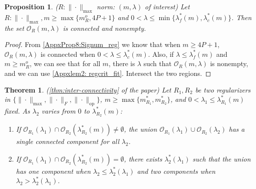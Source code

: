 \documentclass{article}
\newtheorem{theorem}{Theorem}[section]
\newtheorem{proposition}{Proposition}[section]
\newcommand{\op}{\mathrm{op}}
\begin{document}
\begin{proposition}
\label{prop9:nontrivial_l1}
($R: \|\cdot\|_{\max}$ norm: $(m, \lambda)$ of interest) Let $R: \|\cdot\|_{\max}, m \geq \max \{m_R^o, 4P+1\}$ and $0 < \lambda \leq \min\{\lambda_f^*(m), \lambda_c^{*}(m)\}$. Then the set $\mathcal{O}_R(m, \lambda)$ is connected and nonempty.
\end{proposition}
\begin{proof} 
From \cref{AppxProp8:Signum_reg} we know that when $m \geq 4P+1$, $\mathcal{O}_R(m,\lambda)$ is connected when $0 < \lambda \leq \lambda^{*}_c(m)$.
Also, if $\lambda \leq \lambda_f^*(m)$ and $m \geq m_R^o$, we can see that for all $m$, there is $\lambda$ such that $\mathcal{O}_R(m, \lambda)$ is nonempty, and we can use \cref{Appxlem2: regcrit_fit}.
Intersect the two regions.
\end{proof}

\begin{theorem}
\label{appxthm:inter-connectivity} (\cref{thm:inter-connectivity} of the paper)
Let $R_1, R_2$ be two regularizers in $\{\|\cdot\|_{\max}, \|\cdot\|_F, \|\cdot\|_{\op}\}$, $m \geq \max\{m_{R_1}^*, m_{R_2}^*\}$, and $0 < \lambda_1 \leq \lambda_{R_1}^*(m)$ fixed. As $\lambda_2$ varies from $0$ to $\lambda_{R_2}^{*}(m)$:
\begin{enumerate}
    \item[i)] If $\mathcal{O}_{R_1}(\lambda_1) \cap \mathcal{O}_{R_2}(\lambda_{R_2}^{*}(m)) \neq \emptyset$, the union $\mathcal{O}_{R_1}(\lambda_1) \cup \mathcal{O}_{R_2}(\lambda_2)$ has a single connected component for all $\lambda_2$.
    \item[ii)] If $\mathcal{O}_{R_1}(\lambda_1) \cap \mathcal{O}_{R_2}(\lambda_{R_2}^{*}(m)) = \emptyset$, there exists $\lambda_2^*(\lambda_1)$ such that the union has one component when $\lambda_2 \leq \lambda_2^*(\lambda_1)$ and two components when $\lambda_2 > \lambda_2^*(\lambda_1)$.
\end{enumerate}
\end{theorem}
\end{document}
